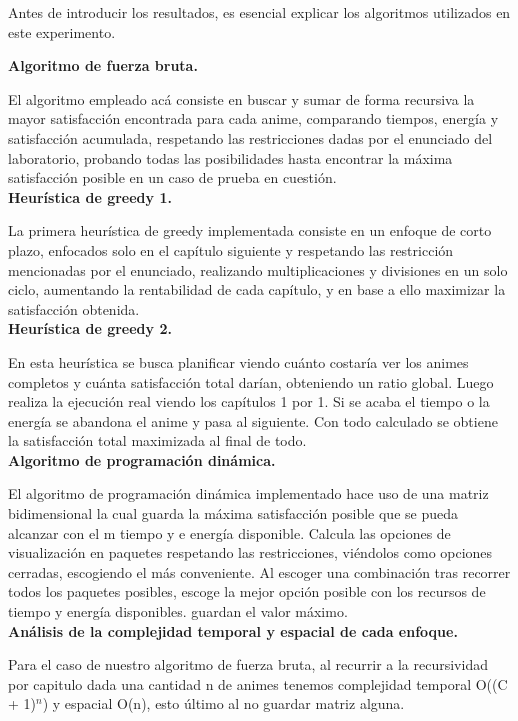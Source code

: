 Antes de introducir los resultados, es esencial explicar los algoritmos utilizados en este experimento.


\textbf{Algoritmo de fuerza bruta.}


El algoritmo empleado acá consiste en buscar y sumar de forma recursiva la mayor satisfacción encontrada para cada anime, comparando tiempos, energía y satisfacción acumulada, respetando las restricciones dadas por el enunciado del laboratorio, probando todas las posibilidades hasta encontrar la máxima satisfacción posible en un caso de prueba en cuestión.
\\

\textbf{Heurística de greedy 1.}


La primera heurística de greedy implementada consiste en un enfoque de corto plazo, enfocados solo en el capítulo siguiente y respetando las restricción mencionadas por el enunciado, realizando multiplicaciones y divisiones en un solo ciclo, aumentando la rentabilidad de cada capítulo, y en base a ello maximizar la satisfacción obtenida.
\\

\textbf{Heurística de greedy 2.}


En esta heurística se busca planificar viendo cuánto costaría ver los animes completos y cuánta satisfacción total darían, obteniendo un ratio global. Luego realiza la ejecución real viendo los capítulos 1 por 1. Si se acaba el tiempo o la energía se abandona el anime y pasa al siguiente. Con todo calculado se obtiene la satisfacción total maximizada al final de todo.
\\

\textbf{Algoritmo de programación dinámica.}


El algoritmo de programación dinámica implementado hace uso de una matriz bidimensional la cual guarda la máxima satisfacción posible que se pueda alcanzar con el m tiempo y e energía disponible.
Calcula las opciones de visualización en paquetes respetando las restricciones, viéndolos como opciones cerradas, escogiendo el más conveniente.
Al escoger una combinación tras recorrer todos los paquetes posibles, escoge la mejor opción posible con los recursos de tiempo y energía disponibles. guardan el valor máximo.
\\

\textbf{Análisis de la complejidad temporal y espacial de cada enfoque.}


Para el caso de nuestro algoritmo de fuerza bruta, al recurrir a la recursividad por capitulo dada una cantidad n de animes tenemos complejidad temporal O((C + 1)$^n$) y espacial O(n), esto último al no guardar matriz alguna.


